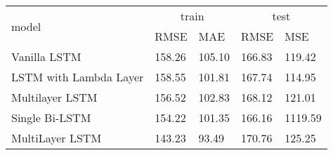 \documentclass{article}
\begin{document}
\begin{table}
  \begin{tabular}{|l|l|l|l|l|}
    \hline
\hline
    \multirow{2}{*}{model} &
      \multicolumn{2}{c}{train} &
      \multicolumn{2}{c|}{test} \\ \cline{2-5}

    & RMSE& MAE & RMSE & MSE \\
    \hline
    Vanilla LSTM &158.26 & 105.10 & 166.83 & 119.42 \\
    \hline
    LSTM with Lambda Layer & 158.55 & 101.81& 167.74 & 114.95 \\
    \hline
    Multilayer LSTM & 156.52 & 102.83 & 168.12 & 121.01 \\
    \hline
Single Bi-LSTM &154.22&101.35&166.16&1119.59 \\
\hline
MultiLayer LSTM & 143.23&93.49 &170.76 & 125.25\\
\hline\hline
  \end{tabular}
\end{table}
\end{document}
